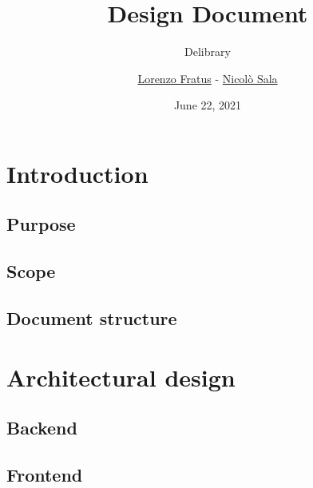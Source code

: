
\graphicspath{ {assets/} }

\title{Design Document}
\subtitle{Delibrary}
\author{\href{https://github.com/lorenzofratus}{Lorenzo Fratus} - \href{https://github.com/nicheosala}{Nicolò Sala}}
\date{June 22, 2021}



\maketitle

\tableofcontents



\chapter{Introduction}

\section{Purpose}

\section{Scope}

\section{Document structure}



\chapter{Architectural design}

\section{Backend}

\section{Frontend}




